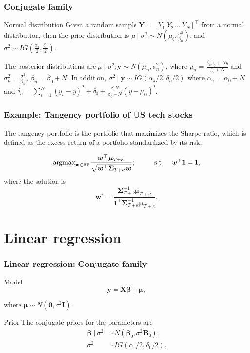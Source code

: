 \documentclass[12pt, compress]{beamer}
\begin{document}
\begin{frame}
	\frametitle{Conjugate family}
\begin{block}{Normal distribution}
	Given a random sample $\bm{Y}=[Y_1 \ Y_2 \ \dots \ Y_N]^{\top}$ from a normal distribution, then the prior distribution is \( \mu \mid \sigma^2 \sim N\left(\mu_0, \frac{\sigma^2}{\beta_0}\right) \), and \( \sigma^2 \sim IG\left(\frac{\alpha_0}{2}, \frac{\delta_0}{2}\right) \).
	
	The posterior distributions are $\mu\mid \sigma^2,\bm{y}\sim N \left(\mu_n, \sigma_n^2\right)$, where $\mu_n=\frac{\beta_0\mu_0+N\bar{y}}{\beta_0+N}$ and $\sigma_n^2=\frac{\sigma^2}{\beta_n}$, $\beta_n=\beta_0+N$. In addition, $\sigma^2\mid \bm{y}\sim IG(\alpha_n/2,\delta_n/2)$ where $\alpha_n=\alpha_0+N$ and $\delta_n=\sum_{i=1}^N (y_i-\bar{y})^2+\delta_0+\frac{\beta_0N}{\beta_0+N}(\bar{y}-\mu_0)^2$.
\end{block}
\end{frame}

\begin{frame}
	\frametitle{Example: Tangency portfolio of US tech stocks}
	
The tangency portfolio is the portfolio that maximizes the Sharpe ratio, which is defined as the excess return of a portfolio standardized by its risk.

\begin{equation*}
	\text{argmax}_{{\bm w}\in \mathbb{R}^{p}} \frac{{\bm w}^{\top}\bm{\mu}_{T+\kappa}}{\sqrt{{\bm w}^{\top}{\bm{\Sigma}}_{T+\kappa} {\bm w}}}; \hspace{1cm} \text{s.t}\hspace{.5cm} {\bm w}^{\top}{\bm{1}}=1,
\end{equation*}
where the solution is
\begin{equation*}
	{\bm w}^*=\frac{{\bm{\Sigma}}^{-1}_{T+\kappa}\bm{\mu}_{T+\kappa}}{{\bm{1}}^{\top}{\bm \Sigma}^{-1}_{T+\kappa}\bm{\mu}_{T+\kappa}}.
\end{equation*}
\end{frame}

\section{Linear regression}


\begin{frame}
	\frametitle{Linear regression: Conjugate family}
\begin{block}{Model}
	\[
	\bm{y} = \bm{X} \bm{\beta} + \bm{\mu},
	\]
	
	where \( \bm{\mu} \sim N(\bm{0}, \sigma^2 \bm{I}) \).
\end{block}

\begin{block}{Prior}
	The conjugate priors for the parameters are
	\begin{align*}
		\bm{\beta}\mid \sigma^2 & \sim N(\bm{\beta}_0, \sigma^2 {\bm{B}}_0),\\
		\sigma^2 & \sim IG(\alpha_0/2, \delta_0/2).
	\end{align*}
\end{block}
\end{frame}
\end{document}
